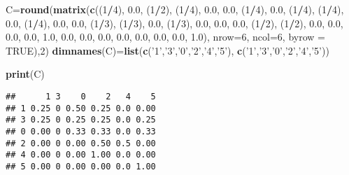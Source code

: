 \documentclass[]{article}
\newenvironment{Shaded}{\begin{snugshade}}{\end{snugshade}}
\newcommand{\DataTypeTok}[1]{\textcolor[rgb]{0.13,0.29,0.53}{#1}}
\newcommand{\DecValTok}[1]{\textcolor[rgb]{0.00,0.00,0.81}{#1}}
\newcommand{\FloatTok}[1]{\textcolor[rgb]{0.00,0.00,0.81}{#1}}
\newcommand{\KeywordTok}[1]{\textcolor[rgb]{0.13,0.29,0.53}{\textbf{#1}}}
\newcommand{\NormalTok}[1]{#1}
\newcommand{\OperatorTok}[1]{\textcolor[rgb]{0.81,0.36,0.00}{\textbf{#1}}}
\newcommand{\OtherTok}[1]{\textcolor[rgb]{0.56,0.35,0.01}{#1}}
\newcommand{\StringTok}[1]{\textcolor[rgb]{0.31,0.60,0.02}{#1}}
\begin{document}
\begin{Shaded}
\begin{Highlighting}[]
\NormalTok{C=}\KeywordTok{round}\NormalTok{(}\KeywordTok{matrix}\NormalTok{(}\KeywordTok{c}\NormalTok{((}\DecValTok{1}\OperatorTok{/}\DecValTok{4}\NormalTok{), }\FloatTok{0.0}\NormalTok{, (}\DecValTok{1}\OperatorTok{/}\DecValTok{2}\NormalTok{), (}\DecValTok{1}\OperatorTok{/}\DecValTok{4}\NormalTok{), }\FloatTok{0.0}\NormalTok{, }\FloatTok{0.0}\NormalTok{, }
\NormalTok{           (}\DecValTok{1}\OperatorTok{/}\DecValTok{4}\NormalTok{), }\FloatTok{0.0}\NormalTok{, (}\DecValTok{1}\OperatorTok{/}\DecValTok{4}\NormalTok{), (}\DecValTok{1}\OperatorTok{/}\DecValTok{4}\NormalTok{), }\FloatTok{0.0}\NormalTok{, (}\DecValTok{1}\OperatorTok{/}\DecValTok{4}\NormalTok{), }
           \FloatTok{0.0}\NormalTok{, }\FloatTok{0.0}\NormalTok{, (}\DecValTok{1}\OperatorTok{/}\DecValTok{3}\NormalTok{), (}\DecValTok{1}\OperatorTok{/}\DecValTok{3}\NormalTok{), }\FloatTok{0.0}\NormalTok{, (}\DecValTok{1}\OperatorTok{/}\DecValTok{3}\NormalTok{),}
           \FloatTok{0.0}\NormalTok{, }\FloatTok{0.0}\NormalTok{, }\FloatTok{0.0}\NormalTok{, (}\DecValTok{1}\OperatorTok{/}\DecValTok{2}\NormalTok{), (}\DecValTok{1}\OperatorTok{/}\DecValTok{2}\NormalTok{), }\FloatTok{0.0}\NormalTok{,}
           \FloatTok{0.0}\NormalTok{, }\FloatTok{0.0}\NormalTok{, }\FloatTok{0.0}\NormalTok{, }\FloatTok{1.0}\NormalTok{, }\FloatTok{0.0}\NormalTok{, }\FloatTok{0.0}\NormalTok{, }
           \FloatTok{0.0}\NormalTok{, }\FloatTok{0.0}\NormalTok{, }\FloatTok{0.0}\NormalTok{, }\FloatTok{0.0}\NormalTok{, }\FloatTok{0.0}\NormalTok{, }\FloatTok{1.0}\NormalTok{), }\DataTypeTok{nrow=}\DecValTok{6}\NormalTok{, }\DataTypeTok{ncol=}\DecValTok{6}\NormalTok{, }\DataTypeTok{byrow =} \OtherTok{TRUE}\NormalTok{),}\DecValTok{2}\NormalTok{)}
\KeywordTok{dimnames}\NormalTok{(C)=}\KeywordTok{list}\NormalTok{(}\KeywordTok{c}\NormalTok{(}\StringTok{'1'}\NormalTok{,}\StringTok{'3'}\NormalTok{,}\StringTok{'0'}\NormalTok{,}\StringTok{'2'}\NormalTok{,}\StringTok{'4'}\NormalTok{,}\StringTok{'5'}\NormalTok{), }\KeywordTok{c}\NormalTok{(}\StringTok{'1'}\NormalTok{,}\StringTok{'3'}\NormalTok{,}\StringTok{'0'}\NormalTok{,}\StringTok{'2'}\NormalTok{,}\StringTok{'4'}\NormalTok{,}\StringTok{'5'}\NormalTok{))}

\KeywordTok{print}\NormalTok{(C)}
\end{Highlighting}
\end{Shaded}

\begin{verbatim}
##      1 3    0    2   4    5
## 1 0.25 0 0.50 0.25 0.0 0.00
## 3 0.25 0 0.25 0.25 0.0 0.25
## 0 0.00 0 0.33 0.33 0.0 0.33
## 2 0.00 0 0.00 0.50 0.5 0.00
## 4 0.00 0 0.00 1.00 0.0 0.00
## 5 0.00 0 0.00 0.00 0.0 1.00
\end{verbatim}
\end{document}
